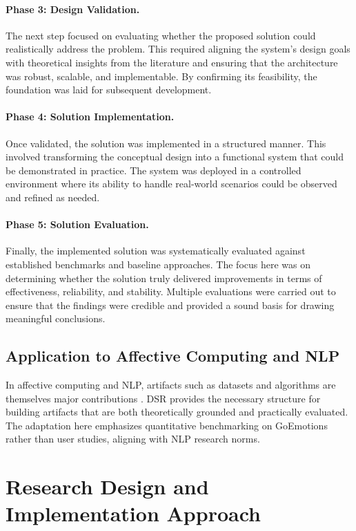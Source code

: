 \paragraph{Phase 3: Design Validation.}
The next step focused on evaluating whether the proposed solution could realistically address the problem. This required aligning the system’s design goals with theoretical insights from the literature and ensuring that the architecture was robust, scalable, and implementable. By confirming its feasibility, the foundation was laid for subsequent development.

\paragraph{Phase 4: Solution Implementation.}
Once validated, the solution was implemented in a structured manner. This involved transforming the conceptual design into a functional system that could be demonstrated in practice. The system was deployed in a controlled environment where its ability to handle real-world scenarios could be observed and refined as needed.

\paragraph{Phase 5: Solution Evaluation.}
Finally, the implemented solution was systematically evaluated against established benchmarks and baseline approaches. The focus here was on determining whether the solution truly delivered improvements in terms of effectiveness, reliability, and stability. Multiple evaluations were carried out to ensure that the findings were credible and provided a sound basis for drawing meaningful conclusions.
\subsection{Application to Affective Computing and NLP}
In affective computing and NLP, artifacts such as datasets and algorithms are themselves major contributions \cite{hirschberg2015advances}. DSR provides the necessary structure for building artifacts that are both theoretically grounded and practically evaluated. The adaptation here emphasizes quantitative benchmarking on GoEmotions rather than user studies, aligning with NLP research norms.

\section{Research Design and Implementation Approach}
\label{sec:research-design}

